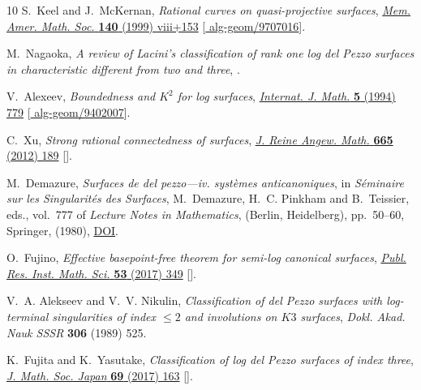 \documentclass[11pt]{amsart}
\theoremstyle{definition}
\theoremstyle{definition}
\theoremstyle{remark}
\theoremstyle{remark}
\theoremstyle{definition}
\theoremstyle{conjecture}
\begin{document}
\begin{thebibliography}{10}
S.~Keel and J.~McKernan, \emph{Rational curves on quasi-projective surfaces},
  \href{https://doi.org/10.1090/memo/0669}{\emph{Mem. Amer. Math. Soc.}
  {\bfseries 140} (1999) viii+153}
  [\href{https://arxiv.org/abs/alg-geom/9707016}{{\ttfamily
  alg-geom/9707016}}].

M.~Nagaoka, \emph{A review of {L}acini's classification of rank one log del
  {P}ezzo surfaces in characteristic different from two and three},
  \href{https://arxiv.org/abs/2512.12294}{{}}.

V.~Alexeev, \emph{Boundedness and {$K^2$} for log surfaces},
  \href{https://doi.org/10.1142/S0129167X94000395}{\emph{Internat. J. Math.}
  {\bfseries 5} (1994) 779}
  [\href{https://arxiv.org/abs/alg-geom/9402007}{{\ttfamily
  alg-geom/9402007}}].

C.~Xu, \emph{Strong rational connectedness of surfaces},
  \href{https://doi.org/10.1515/CRELLE.2011.108}{\emph{J. Reine Angew. Math.}
  {\bfseries 665} (2012) 189}
  [\href{https://arxiv.org/abs/0810.2597}{{}}].

M.~Demazure, \emph{Surfaces de del pezzo---iv. systèmes anticanoniques},  in
  \emph{Séminaire sur les Singularités des Surfaces}, M.~Demazure, H.~C.
  Pinkham and B.~Teissier, eds., vol.~777 of \emph{Lecture Notes in
  Mathematics}, (Berlin, Heidelberg), pp.~50--60, Springer, (1980),
  \href{https://doi.org/10.1007/BFb0085872}{DOI}.

O.~Fujino, \emph{Effective basepoint-free theorem for semi-log canonical
  surfaces}, \href{https://doi.org/10.4171/PRIMS/53-3-1}{\emph{Publ. Res. Inst.
  Math. Sci.} {\bfseries 53} (2017) 349}
  [\href{https://arxiv.org/abs/1509.07268}{{}}].

V.~A. Alekseev and V.~V. Nikulin, \emph{Classification of del {P}ezzo surfaces
  with log-terminal singularities of index {$\le 2$} and involutions on {$K3$}
  surfaces}, {\emph{Dokl. Akad. Nauk SSSR} {\bfseries 306} (1989) 525}.

K.~Fujita and K.~Yasutake, \emph{Classification of log del {P}ezzo surfaces of
  index three}, \href{https://doi.org/10.2969/jmsj/06910163}{\emph{J. Math.
  Soc. Japan} {\bfseries 69} (2017) 163}
  [\href{https://arxiv.org/abs/1401.1283}{{}}].


\end{thebibliography}
\end{document}

